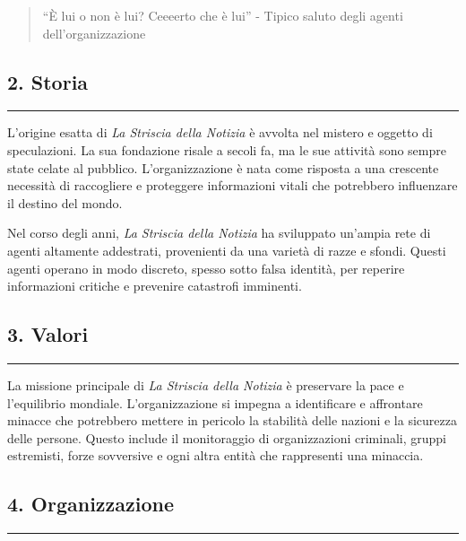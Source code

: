 \begin{quote}
``È lui o non è lui? Ceeeerto che è lui'' - Tipico saluto degli agenti
dell'organizzazione
\end{quote}

\subsection{2. Storia}\label{storia}

\begin{center}\rule{0.5\linewidth}{0.5pt}\end{center}

L'origine esatta di \emph{La Striscia della Notizia} è avvolta nel
mistero e oggetto di speculazioni. La sua fondazione risale a secoli fa,
ma le sue attività sono sempre state celate al pubblico.
L'organizzazione è nata come risposta a una crescente necessità di
raccogliere e proteggere informazioni vitali che potrebbero influenzare
il destino del mondo.

Nel corso degli anni, \emph{La Striscia della Notizia} ha sviluppato
un'ampia rete di agenti altamente addestrati, provenienti da una varietà
di razze e sfondi. Questi agenti operano in modo discreto, spesso sotto
falsa identità, per reperire informazioni critiche e prevenire
catastrofi imminenti.

\subsection{3. Valori}\label{valori}

\begin{center}\rule{0.5\linewidth}{0.5pt}\end{center}

La missione principale di \emph{La Striscia della Notizia} è preservare
la pace e l'equilibrio mondiale. L'organizzazione si impegna a
identificare e affrontare minacce che potrebbero mettere in pericolo la
stabilità delle nazioni e la sicurezza delle persone. Questo include il
monitoraggio di organizzazioni criminali, gruppi estremisti, forze
sovversive e ogni altra entità che rappresenti una minaccia.

\subsection{4. Organizzazione}\label{organizzazione}

\begin{center}\rule{0.5\linewidth}{0.5pt}\end{center}

